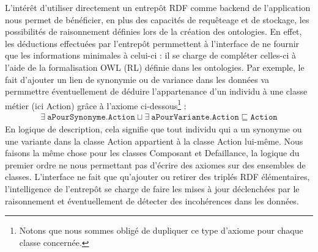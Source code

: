 L'intérêt d'utiliser directement un entrepôt RDF comme backend de l'application nous permet de bénéficier, en plus des capacités de requêteage et de stockage, les possibilités de raisonnement définies lors de la création des ontologies. En effet, les déductions effectuées par l'entrepôt permmettent à l'interface de ne fournir que les informations minimales à celui-ci : il se charge de compléter celles-ci à l'aide de la formalisation OWL (RL)\cite{owlprofiles} définie dans les ontologies. Par exemple, le fait d'ajouter un lien de synonymie ou de variance dans les données va permmettre éventuellement de déduire l'appartenance d'un individu à une classe métier (ici Action) grâce à l'axiome ci-dessous\footnote{Notons que nous sommes obligé de dupliquer ce type d'axiome pour chaque classe concernée.
} :
$$
\begin{array}{ll}
\exists  \ \texttt{aPourSynonyme} .  \texttt {Action}  \sqcup \exists  \ \texttt{aPourVariante} .  \texttt {Action}
\sqsubseteq    \texttt{Action}
\end{array}
$$
En logique de description, cela signifie que tout individu qui a un synonyme ou une variante dans la classe Action appartient à la classe Action lui-même. Nous faisons la même chose pour les classes Composant et Defaillance, la logique du premier ordre ne nous permettant pas d'écrire des axiomes sur des ensembles de classes.
L'interface ne fait que qu'ajouter ou retirer des triplés RDF élémentaires, l'intelligence de l'entrepôt se charge de faire les mises à jour déclenchées par le raisonnement et éventuellement de détecter des incohérences dans les données.
